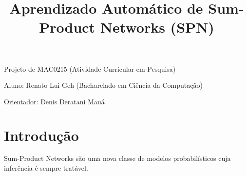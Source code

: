 \documentclass[a4paper,10pt]{article}
\title{\textbf{Aprendizado Automático de Sum-Product Networks (SPN)}}
\begin{document}
\date{}
\author{}
\vspace*{-40pt}
{\let\newpage\relax\maketitle}

Projeto de MAC0215 (Atividade Curricular em Pesquisa)

Aluno: Renato Lui Geh (Bacharelado em Ciência da Computação)

Orientador: Denis Deratani Mauá
\section{Introdução}

Sum-Product Networks são uma nova classe de modelos probabilísticos cuja inferência é sempre
tratável.
\end{document}
